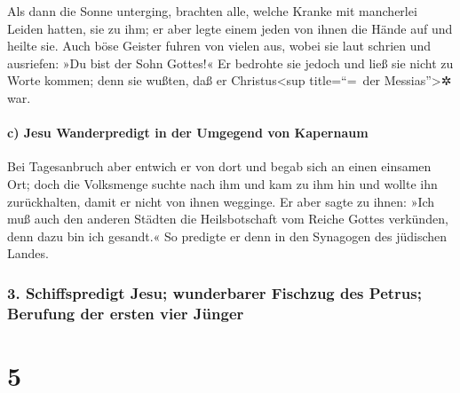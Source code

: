  Als dann die Sonne unterging, brachten alle, welche
Kranke mit mancherlei Leiden hatten, sie zu ihm; er aber legte einem
jeden von ihnen die Hände auf und heilte sie.  Auch böse
Geister fuhren von vielen aus, wobei sie laut schrien und ausriefen: »Du
bist der Sohn Gottes!« Er bedrohte sie jedoch und ließ sie nicht zu
Worte kommen; denn sie wußten, daß er Christus\textless sup
title=``=~der Messias''\textgreater✲ war.

\hypertarget{c-jesu-wanderpredigt-in-der-umgegend-von-kapernaum}{%
\paragraph{c) Jesu Wanderpredigt in der Umgegend von
Kapernaum}\label{c-jesu-wanderpredigt-in-der-umgegend-von-kapernaum}}

 Bei Tagesanbruch aber entwich er von dort und begab sich
an einen einsamen Ort; doch die Volksmenge suchte nach ihm und kam zu
ihm hin und wollte ihn zurückhalten, damit er nicht von ihnen wegginge.
 Er aber sagte zu ihnen: »Ich muß auch den anderen
Städten die Heilsbotschaft vom Reiche Gottes verkünden, denn dazu bin
ich gesandt.«  So predigte er denn in den Synagogen des
jüdischen Landes.

\hypertarget{schiffspredigt-jesu-wunderbarer-fischzug-des-petrus-berufung-der-ersten-vier-juxfcnger}{%
\subsubsection{3. Schiffspredigt Jesu; wunderbarer Fischzug des Petrus;
Berufung der ersten vier
Jünger}\label{schiffspredigt-jesu-wunderbarer-fischzug-des-petrus-berufung-der-ersten-vier-juxfcnger}}

\hypertarget{section-4}{%
\section{5}\label{section-4}}


